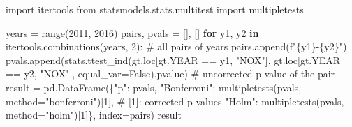 \documentclass[
  letterpaper,
  DIV=11,
  numbers=noendperiod]{scrreprt}
\newenvironment{Shaded}{\begin{snugshade}}{\end{snugshade}}
\newcommand{\BuiltInTok}[1]{\textcolor[rgb]{0.00,0.23,0.31}{#1}}
\newcommand{\CommentTok}[1]{\textcolor[rgb]{0.37,0.37,0.37}{#1}}
\newcommand{\ControlFlowTok}[1]{\textcolor[rgb]{0.00,0.23,0.31}{\textbf{#1}}}
\newcommand{\DecValTok}[1]{\textcolor[rgb]{0.68,0.00,0.00}{#1}}
\newcommand{\ImportTok}[1]{\textcolor[rgb]{0.00,0.46,0.62}{#1}}
\newcommand{\KeywordTok}[1]{\textcolor[rgb]{0.00,0.23,0.31}{\textbf{#1}}}
\newcommand{\NormalTok}[1]{\textcolor[rgb]{0.00,0.23,0.31}{#1}}
\newcommand{\OperatorTok}[1]{\textcolor[rgb]{0.37,0.37,0.37}{#1}}
\newcommand{\SpecialCharTok}[1]{\textcolor[rgb]{0.37,0.37,0.37}{#1}}
\newcommand{\SpecialStringTok}[1]{\textcolor[rgb]{0.13,0.47,0.30}{#1}}
\newcommand{\StringTok}[1]{\textcolor[rgb]{0.13,0.47,0.30}{#1}}
\newcommand{\VariableTok}[1]{\textcolor[rgb]{0.07,0.07,0.07}{#1}}
\begin{document}
\begin{tcolorbox}[enhanced jigsaw, left=2mm, title=\textcolor{quarto-callout-caution-color}{\faFire}\hspace{0.5em}{Solution to Exercise 4}, opacityback=0, breakable, rightrule=.15mm, arc=.35mm, toptitle=1mm, colbacktitle=quarto-callout-caution-color!10!white, opacitybacktitle=0.6, coltitle=black, colframe=quarto-callout-caution-color-frame, bottomrule=.15mm, leftrule=.75mm, bottomtitle=1mm, titlerule=0mm, toprule=.15mm, colback=white]

\begin{Shaded}
\begin{Highlighting}[]
\ImportTok{import}\NormalTok{ itertools}
\ImportTok{from}\NormalTok{ statsmodels.stats.multitest }\ImportTok{import}\NormalTok{ multipletests}

\NormalTok{years }\OperatorTok{=} \BuiltInTok{range}\NormalTok{(}\DecValTok{2011}\NormalTok{, }\DecValTok{2016}\NormalTok{)}
\NormalTok{pairs, pvals }\OperatorTok{=}\NormalTok{ [], []}
\ControlFlowTok{for}\NormalTok{ y1, y2 }\KeywordTok{in}\NormalTok{ itertools.combinations(years, }\DecValTok{2}\NormalTok{):              }\CommentTok{\# all pairs of years}
\NormalTok{    pairs.append(}\SpecialStringTok{f"}\SpecialCharTok{\{}\NormalTok{y1}\SpecialCharTok{\}}\SpecialStringTok{{-}}\SpecialCharTok{\{}\NormalTok{y2}\SpecialCharTok{\}}\SpecialStringTok{"}\NormalTok{)}
\NormalTok{    pvals.append(stats.ttest\_ind(gt.loc[gt.YEAR }\OperatorTok{==}\NormalTok{ y1, }\StringTok{"NOX"}\NormalTok{], gt.loc[gt.YEAR }\OperatorTok{==}\NormalTok{ y2, }\StringTok{"NOX"}\NormalTok{],}
\NormalTok{                                 equal\_var}\OperatorTok{=}\VariableTok{False}\NormalTok{).pvalue)    }\CommentTok{\# uncorrected p{-}value of the pair}
\NormalTok{result }\OperatorTok{=}\NormalTok{ pd.DataFrame(\{}\StringTok{"p"}\NormalTok{: pvals,}
                       \StringTok{"Bonferroni"}\NormalTok{: multipletests(pvals, method}\OperatorTok{=}\StringTok{"bonferroni"}\NormalTok{)[}\DecValTok{1}\NormalTok{],  }\CommentTok{\# [1]: corrected p{-}values}
                       \StringTok{"Holm"}\NormalTok{: multipletests(pvals, method}\OperatorTok{=}\StringTok{"holm"}\NormalTok{)[}\DecValTok{1}\NormalTok{]\}, index}\OperatorTok{=}\NormalTok{pairs)}
\NormalTok{result}
\end{Highlighting}
\end{Shaded}


\end{tcolorbox}
\end{document}
